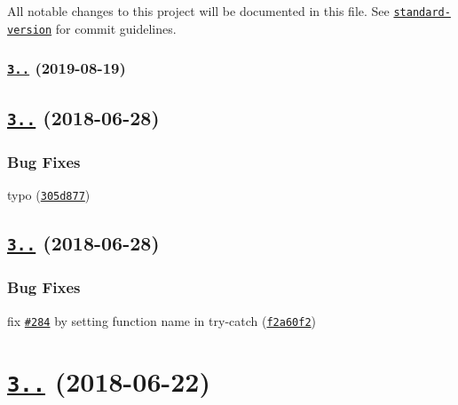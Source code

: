 All notable changes to this project will be documented in this file. See \href{https://github.com/conventional-changelog/standard-version}{\tt standard-\/version} for commit guidelines.

\subsubsection*{\href{https://github.com/kelektiv/node-uuid/compare/v3.3.2...v3.3.3}{\tt 3..} (2019-\/08-\/19)}

\label{_3.3.2}%
 \subsection*{\href{https://github.com/kelektiv/node-uuid/compare/v3.3.1...v3.3.2}{\tt 3..} (2018-\/06-\/28)}

\subsubsection*{Bug Fixes}


\begin{DoxyItemize}
\item typo (\href{https://github.com/kelektiv/node-uuid/commit/305d877}{\tt 305d877})
\end{DoxyItemize}

\label{_3.3.1}%
 \subsection*{\href{https://github.com/kelektiv/node-uuid/compare/v3.3.0...v3.3.1}{\tt 3..} (2018-\/06-\/28)}

\subsubsection*{Bug Fixes}


\begin{DoxyItemize}
\item fix \href{https://github.com/kelektiv/node-uuid/issues/284}{\tt \#284} by setting function name in try-\/catch (\href{https://github.com/kelektiv/node-uuid/commit/f2a60f2}{\tt f2a60f2})
\end{DoxyItemize}

\label{_3.3.0}%
 \section*{\href{https://github.com/kelektiv/node-uuid/compare/v3.2.1...v3.3.0}{\tt 3..} (2018-\/06-\/22)}

